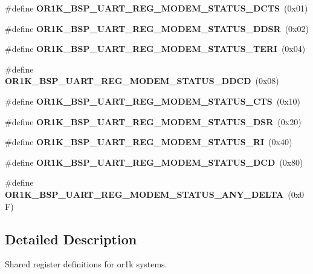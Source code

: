 \begin{DoxyCompactItemize}
\#define {\bfseries O\+R1\+K\+\_\+\+B\+S\+P\+\_\+\+U\+A\+R\+T\+\_\+\+R\+E\+G\+\_\+\+M\+O\+D\+E\+M\+\_\+\+S\+T\+A\+T\+U\+S\+\_\+\+D\+C\+TS}~(0x01)
\item 
\mbox{\label{group__generic__or1k__reg_gae9a74cdea3536825119c3142f9201fe3}} 
\#define {\bfseries O\+R1\+K\+\_\+\+B\+S\+P\+\_\+\+U\+A\+R\+T\+\_\+\+R\+E\+G\+\_\+\+M\+O\+D\+E\+M\+\_\+\+S\+T\+A\+T\+U\+S\+\_\+\+D\+D\+SR}~(0x02)
\item 
\mbox{\label{group__generic__or1k__reg_gac4b51042ffea9d9520afa16bb175b423}} 
\#define {\bfseries O\+R1\+K\+\_\+\+B\+S\+P\+\_\+\+U\+A\+R\+T\+\_\+\+R\+E\+G\+\_\+\+M\+O\+D\+E\+M\+\_\+\+S\+T\+A\+T\+U\+S\+\_\+\+T\+E\+RI}~(0x04)
\item 
\mbox{\label{group__generic__or1k__reg_ga34e7dca7b68b304a09b701a262bb2adc}} 
\#define {\bfseries O\+R1\+K\+\_\+\+B\+S\+P\+\_\+\+U\+A\+R\+T\+\_\+\+R\+E\+G\+\_\+\+M\+O\+D\+E\+M\+\_\+\+S\+T\+A\+T\+U\+S\+\_\+\+D\+D\+CD}~(0x08)
\item 
\mbox{\label{group__generic__or1k__reg_gaa2206e5b289896c2d3b7626aa9d43fd1}} 
\#define {\bfseries O\+R1\+K\+\_\+\+B\+S\+P\+\_\+\+U\+A\+R\+T\+\_\+\+R\+E\+G\+\_\+\+M\+O\+D\+E\+M\+\_\+\+S\+T\+A\+T\+U\+S\+\_\+\+C\+TS}~(0x10)
\item 
\mbox{\label{group__generic__or1k__reg_gae1be960abb5d4416c98b015e07792077}} 
\#define {\bfseries O\+R1\+K\+\_\+\+B\+S\+P\+\_\+\+U\+A\+R\+T\+\_\+\+R\+E\+G\+\_\+\+M\+O\+D\+E\+M\+\_\+\+S\+T\+A\+T\+U\+S\+\_\+\+D\+SR}~(0x20)
\item 
\mbox{\label{group__generic__or1k__reg_ga705a8cbfe3a76f58d42c0f114097ca91}} 
\#define {\bfseries O\+R1\+K\+\_\+\+B\+S\+P\+\_\+\+U\+A\+R\+T\+\_\+\+R\+E\+G\+\_\+\+M\+O\+D\+E\+M\+\_\+\+S\+T\+A\+T\+U\+S\+\_\+\+RI}~(0x40)
\item 
\mbox{\label{group__generic__or1k__reg_gada63cbe200327c9db24e4c0ee1687f8a}} 
\#define {\bfseries O\+R1\+K\+\_\+\+B\+S\+P\+\_\+\+U\+A\+R\+T\+\_\+\+R\+E\+G\+\_\+\+M\+O\+D\+E\+M\+\_\+\+S\+T\+A\+T\+U\+S\+\_\+\+D\+CD}~(0x80)
\item 
\mbox{\label{group__generic__or1k__reg_gadf15cf60f81af4a99dc4f135bb7845a9}} 
\#define {\bfseries O\+R1\+K\+\_\+\+B\+S\+P\+\_\+\+U\+A\+R\+T\+\_\+\+R\+E\+G\+\_\+\+M\+O\+D\+E\+M\+\_\+\+S\+T\+A\+T\+U\+S\+\_\+\+A\+N\+Y\+\_\+\+D\+E\+L\+TA}~(0x0\+F)
\end{DoxyCompactItemize}


\subsection{Detailed Description}
Shared register definitions for or1k systems. 

